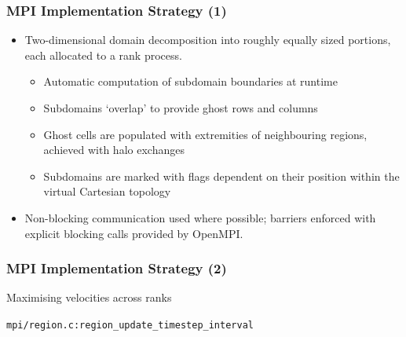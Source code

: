 \documentclass[aspectratio=169]{beamer}
\numberwithin{figure}{section}
\begin{document}
\begin{frame}
    \frametitle{MPI Implementation Strategy (1)}
    \begin{itemize}
        \item Two-dimensional domain decomposition into roughly equally sized
            portions, each allocated to a rank
            process.
            \begin{itemize}
                \item Automatic computation of subdomain boundaries at runtime
                \item Subdomains `overlap' to provide ghost rows and columns
                \item Ghost cells are populated with extremities of neighbouring
                    regions, achieved with halo exchanges
                \item Subdomains are marked with flags dependent on their
                    position within the virtual Cartesian topology
            \end{itemize}
        \item Non-blocking communication used where possible; barriers enforced
            with explicit blocking calls provided by OpenMPI.
    \end{itemize}
\end{frame}
\begin{frame}
    \frametitle{MPI Implementation Strategy (2)}
    \begin{center}
        \begin{minipage}{.66\textwidth}
            
        \end{minipage}\vfill%
        Maximising velocities across ranks

        \footnotesize\texttt{mpi/region.c:region\_update\_timestep\_interval}
    \end{center}
\end{frame}
\end{document}
